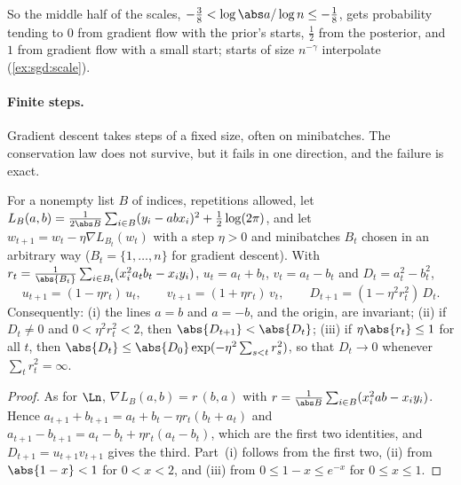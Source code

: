\begin{refsection}
So the middle half of the scales, $-\frac38<\log\abs a/\log n\le-\frac18$, gets probability tending to $0$ from gradient flow with the prior's starts, $\frac12$ from the posterior, and $1$ from gradient flow with a small start; starts of size $n^{-\gamma}$ interpolate (\cref{ex:sgd:scale}).

\paragraph{Finite steps.} Gradient descent takes steps of a fixed size, often on minibatches. The conservation law does not survive, but it fails in one direction, and the failure is exact.

\begin{proposition}\label{prop:sgd:discrete}
For a nonempty list $B$ of indices, repetitions allowed, let $L_B(a,b)=\frac1{2\abs B}\sum_{i\in B}(y_i-abx_i)^2+\frac12\log(2\pi)$, and let $w_{t+1}=w_t-\eta\nabla L_{B_t}(w_t)$ with a step $\eta>0$ and minibatches $B_t$ chosen in an arbitrary way ($B_t=\{1,\dots,n\}$ for gradient descent). With $r_t=\frac1{\abs{B_t}}\sum_{i\in B_t}(x_i^2a_tb_t-x_iy_i)$, $u_t=a_t+b_t$, $v_t=a_t-b_t$ and $D_t=a_t^2-b_t^2$,
\begin{equation}\label{eq:sgd:discrete}
u_{t+1}=(1-\eta r_t)\,u_t,\qquad v_{t+1}=(1+\eta r_t)\,v_t,\qquad D_{t+1}=(1-\eta^2r_t^2)\,D_t .
\end{equation}
Consequently: (i) the lines $a=b$ and $a=-b$, and the origin, are invariant; (ii) if $D_t\ne0$ and $0<\eta^2r_t^2<2$, then $\abs{D_{t+1}}<\abs{D_t}$; (iii) if $\eta\abs{r_t}\le1$ for all $t$, then $\abs{D_t}\le\abs{D_0}\exp(-\eta^2\sum_{s<t}r_s^2)$, so that $D_t\to0$ whenever $\sum_tr_t^2=\infty$.
\end{proposition}

\begin{proof}
As for $\Ln$, $\nabla L_B(a,b)=r\,(b,a)$ with $r=\frac1{\abs B}\sum_{i\in B}(x_i^2ab-x_iy_i)$. Hence $a_{t+1}+b_{t+1}=a_t+b_t-\eta r_t(b_t+a_t)$ and $a_{t+1}-b_{t+1}=a_t-b_t+\eta r_t(a_t-b_t)$, which are the first two identities, and $D_{t+1}=u_{t+1}v_{t+1}$ gives the third. Part~(i) follows from the first two, (ii) from $\abs{1-x}<1$ for $0<x<2$, and (iii) from $0\le1-x\le e^{-x}$ for $0\le x\le1$.
\end{proof}


\end{refsection}
